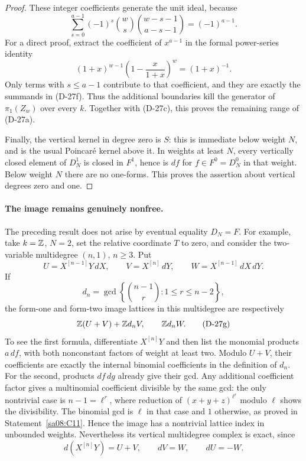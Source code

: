 \begin{proof}
These integer coefficients generate the unit ideal, because
\[
 \sum_{s=0}^{a-1}(-1)^s
       \binom ws\binom{w-s-1}{a-s-1}
             =(-1)^{a-1}.
 \tag{D-27f}
\]
For a direct proof, extract the coefficient of \(x^{a-1}\)
in the formal power-series identity
\[
 (1+x)^{w-1}
     \left(1-\frac{x}{1+x}\right)^w=(1+x)^{-1}.
\]
Only terms with \(s\le a-1\) contribute to that coefficient,
and they are exactly the summands in (D-27f).
Thus the additional boundaries kill the generator of
\(\pi_1(Z_w)\) over every \(k\). Together with (D-27c),
this proves the remaining range of (D-27a).

Finally, the vertical kernel in degree zero is \(S\):
this is immediate below weight \(N\), and is the usual
Poincar\'e kernel above it. In weights at least \(N\),
every vertically closed element of \(D_N^1\) is closed
in \(F^1\), hence is \(df\) for \(f\in F^0=D_N^0\)
in that weight. Below weight \(N\) there are no one-forms.
This proves the assertion about vertical degrees zero and one.
\end{proof}

\paragraph{The image remains genuinely nonfree.}
The preceding result does not arise by eventual equality
\(D_N=F\). For example, take \(k=\mathbb Z\), \(N=2\), set the
relative coordinate \(T\) to zero, and consider the
two-variable multidegree \((n,1)\), \(n\ge3\). Put
\[
 U=X^{[n-1]}Y\,dX,\qquad
 V=X^{[n]}\,dY,\qquad
 W=X^{[n-1]}\,dX\,dY.
 \]
If
\[
 d_n=\gcd\left\{\binom{n-1}{r}:1\le r\le n-2\right\},
\]
the form-one and form-two image lattices in this
multidegree are respectively
\[
 \mathbb Z(U+V)+\mathbb Z d_nV,\qquad \mathbb Z d_nW.
 \tag{D-27g}
\]
To see the first formula, differentiate \(X^{[n]}Y\)
and then list the monomial products \(a\,df\), with
both nonconstant factors of weight at least two.
Modulo \(U+V\), their coefficients are exactly the
internal binomial coefficients in the definition of \(d_n\).
For the second, products \(df\,dg\) already give their
gcd. Any additional coefficient factor gives a
multinomial coefficient divisible by the same gcd:
the only nontrivial case is \(n-1=\ell^r\), where
reduction of \((x+y+z)^{\ell^r}\) modulo \(\ell\)
shows the divisibility. The binomial gcd is \(\ell\)
in that case and \(1\) otherwise, as proved in
Statement~\ref{sa08:C11}.
Hence the image has a nontrivial lattice index in
unbounded weights. Nevertheless its vertical
multidegree complex is exact, since
\[
 d(X^{[n]}Y)=U+V,\qquad dV=W,\qquad dU=-W.
\]

